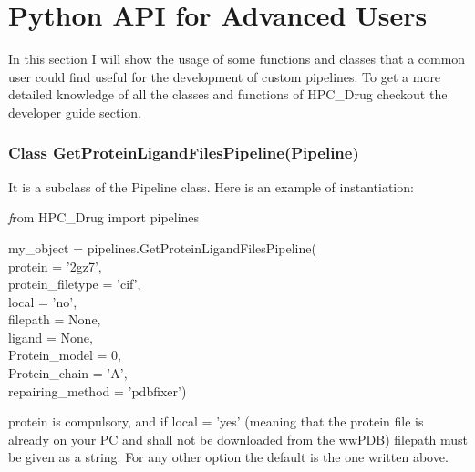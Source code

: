 

\section{Python API for Advanced Users}

    In this section I will show the usage of some functions and classes that a common user could find useful for the development of custom pipelines. To get a more detailed knowledge of all the classes and functions of HPC\_Drug checkout the developer guide section.
    
    \subsubsection{Class GetProteinLigandFilesPipeline(Pipeline)}
    
	    It is a subclass of the Pipeline class. Here is an example of instantiation:
	    
	    {\textit from HPC\_Drug import pipelines
	    
		my\_object = pipelines.GetProteinLigandFilesPipeline(\\
		protein = '2gz7',\\
		protein\_filetype = 'cif',\\
		local = 'no',\\
		filepath = None,\\
		ligand = None,\\
		Protein\_model = 0,\\
		Protein\_chain = 'A',\\
		repairing\_method = 'pdbfixer')}
	
		protein is compulsory, and if local = 'yes' (meaning that the protein file is already on your PC and shall not be downloaded from the wwPDB) filepath must be given as a string. For any other option the default is the one written above.
		
